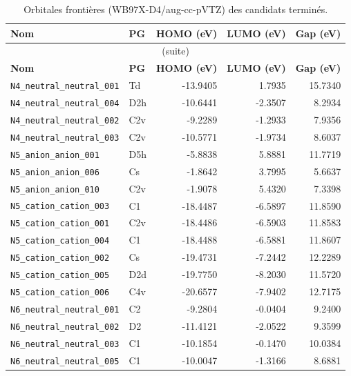 {\scriptsize
\begin{longtable}{@{}p{4.6cm}p{1.6cm}rrr@{}}
\caption{Orbitales frontières (WB97X-D4/aug-cc-pVTZ) des candidats termin\'es.}
\label{tab:homolumo}\\
\toprule
\textbf{Nom} & \textbf{PG} & \textbf{HOMO (eV)} & \textbf{LUMO (eV)} & \textbf{Gap (eV)} \\
\midrule\endfirsthead
\multicolumn{5}{c}{\small (suite)}\\ \toprule
\textbf{Nom} & \textbf{PG} & \textbf{HOMO (eV)} & \textbf{LUMO (eV)} & \textbf{Gap (eV)} \\
\midrule\endhead
\bottomrule\endfoot
\bottomrule\endlastfoot
\addlinespace
\texttt{N4\_neutral\_neutral\_001} & Td & -13.9405 & 1.7935 & 15.7340 \\
\texttt{N4\_neutral\_neutral\_004} & D2h & -10.6441 & -2.3507 & 8.2934 \\
\texttt{N4\_neutral\_neutral\_002} & C2v & -9.2289 & -1.2933 & 7.9356 \\
\texttt{N4\_neutral\_neutral\_003} & C2v & -10.5771 & -1.9734 & 8.6037 \\
\addlinespace
\texttt{N5\_anion\_anion\_001} & D5h & -5.8838 & 5.8881 & 11.7719 \\
\texttt{N5\_anion\_anion\_006} & Cs & -1.8642 & 3.7995 & 5.6637 \\
\texttt{N5\_anion\_anion\_010} & C2v & -1.9078 & 5.4320 & 7.3398 \\
\texttt{N5\_cation\_cation\_003} & C1 & -18.4487 & -6.5897 & 11.8590 \\
\texttt{N5\_cation\_cation\_001} & C2v & -18.4486 & -6.5903 & 11.8583 \\
\texttt{N5\_cation\_cation\_004} & C1 & -18.4488 & -6.5881 & 11.8607 \\
\texttt{N5\_cation\_cation\_002} & Cs & -19.4731 & -7.2442 & 12.2289 \\
\texttt{N5\_cation\_cation\_005} & D2d & -19.7750 & -8.2030 & 11.5720 \\
\texttt{N5\_cation\_cation\_006} & C4v & -20.6577 & -7.9402 & 12.7175 \\
\addlinespace
\texttt{N6\_neutral\_neutral\_001} & C2 & -9.2804 & -0.0404 & 9.2400 \\
\texttt{N6\_neutral\_neutral\_002} & D2 & -11.4121 & -2.0522 & 9.3599 \\
\texttt{N6\_neutral\_neutral\_003} & C1 & -10.1854 & -0.1470 & 10.0384 \\
\texttt{N6\_neutral\_neutral\_005} & C1 & -10.0047 & -1.3166 & 8.6881 \\

\end{longtable}}
